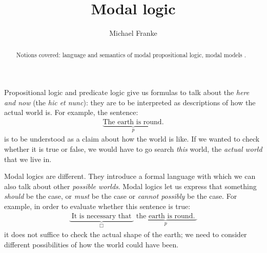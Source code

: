 \documentclass[nobib,nofonts]{tufte-handout}
\title{Modal logic}
\author{Michael Franke}
\date{} %
\begin{document}
\maketitle

\begin{abstract}
\noindent
Notions covered:
language and semantics of modal propositional logic,
modal models
.
\end{abstract}

Propositional logic and predicate logic give us formulas to talk about the \emph{here and now} (the \emph{hic et nunc}): they are to be interpreted as descriptions of how the actual world is.
For example, the sentence:
%
\begin{align*}
  \underbrace{\text{The earth is round.}}_{p}
\end{align*}
%
is to be understood as a claim about how the world is like.
If we wanted to check whether it is true or false, we would have to go search \emph{this} world, the \emph{actual world} that we live in.

Modal logics are different.
They introduce a formal language with which we can also talk about other \emph{possible worlds}.
Modal logics let us express that something \emph{should} be the case, or \emph{must} be the case or \emph{cannot possibly} be the case.
For example, in order to evaluate whether this sentence is true:
\begin{align*}
  \underbrace{\text{ It is necessary that }}_{\Box}
  \underbrace{\text{ the earth is round. }}_{p}
\end{align*}
it does not suffice to check the actual shape of the earth; we need to consider different possibilities of how the world could have been.
\end{document}
